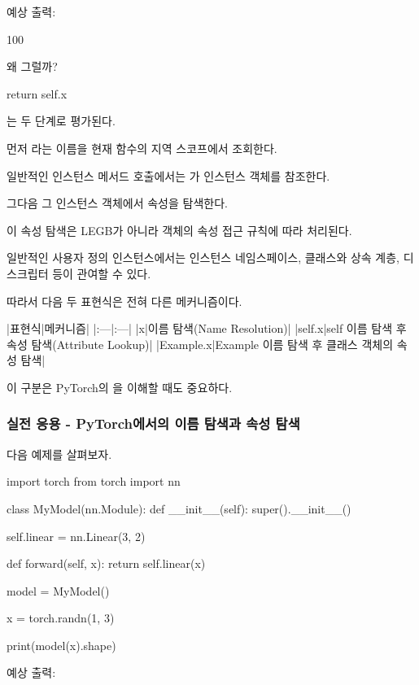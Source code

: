 예상 출력:

\begin{dhkzsh}
100
\end{dhkzsh}

왜 그럴까?

\begin{dhkcode}
return self.x
\end{dhkcode}

는 두 단계로 평가된다.

먼저 라는 이름을 현재 함수의 지역 스코프에서 조회한다.

일반적인 인스턴스 메서드 호출에서는 가 인스턴스 객체를 참조한다.

그다음 그 인스턴스 객체에서  속성을 탐색한다.

이 속성 탐색은 LEGB가 아니라 객체의 속성 접근 규칙에 따라 처리된다.

일반적인 사용자 정의 인스턴스에서는 인스턴스 네임스페이스, 클래스와 상속 계층, 디스크립터 등이 관여할 수 있다.

따라서 다음 두 표현식은 전혀 다른 메커니즘이다.

\begin{dhktable}
|표현식|메커니즘|
|:---|:---|
|x|이름 탐색(Name Resolution)|
|self.x|self 이름 탐색 후 속성 탐색(Attribute Lookup)|
|Example.x|Example 이름 탐색 후 클래스 객체의 속성 탐색|
\end{dhktable}

이 구분은 PyTorch의 을 이해할 때도 중요하다.

\subsubsection{실전 응용 - PyTorch에서의 이름 탐색과 속성 탐색}

다음 예제를 살펴보자.

\begin{dhkcode}
import torch
from torch import nn


class MyModel(nn.Module):
    def __init__(self):
        super().__init__()

        self.linear = nn.Linear(3, 2)

    def forward(self, x):
        return self.linear(x)


model = MyModel()

x = torch.randn(1, 3)

print(model(x).shape)
\end{dhkcode}

예상 출력:

